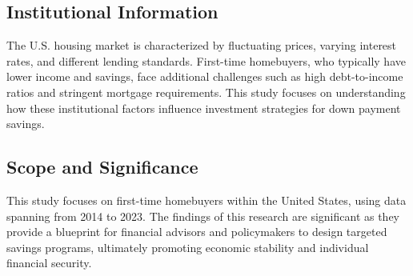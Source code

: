 \subsection{Institutional Information}
The U.S. housing market is characterized by fluctuating prices, varying interest rates, and different lending standards. First-time homebuyers, who typically have lower income and savings, face additional challenges such as high debt-to-income ratios and stringent mortgage requirements. This study focuses on understanding how these institutional factors influence investment strategies for down payment savings.

\subsection{Scope and Significance}
This study focuses on first-time homebuyers within the United States, using data spanning from 2014 to 2023. The findings of this research are significant as they provide a blueprint for financial advisors and policymakers to design targeted savings programs, ultimately promoting economic stability and individual financial security.
